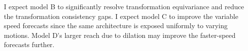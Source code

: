 I expect model B to significantly resolve transformation equivariance and reduce the transformation consistency gaps. I expect model C to improve the variable speed forecasts since the same architecture is exposed uniformly to varying motions. Model D's larger reach due to dilation may improve the faster-speed forecasts further.

